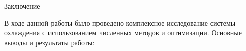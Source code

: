 \documentclass{beamer}
\begin{document}
\begin{frame}{Заключение}

	В ходе данной работы было проведено комплексное исследование системы охлаждения с использованием численных методов и оптимизации. Основные выводы и результаты работы:








\end{frame}
\end{document}
